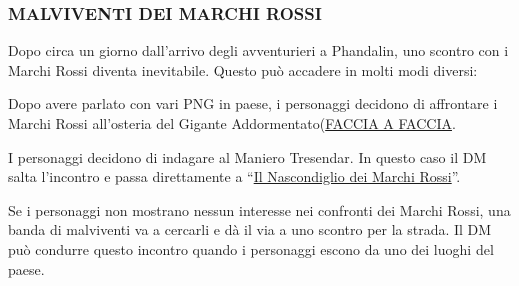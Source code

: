 \documentclass{article}
\begin{document}
\subsubsection{MALVIVENTI DEI MARCHI ROSSI}
\hypertarget{incontro}{}
Dopo circa un giorno dall'arrivo degli avventurieri a
Phandalin, uno scontro con i Marchi Rossi diventa
inevitabile. Questo può accadere in molti modi diversi:
\begin{enumerate}{
    \item Dopo avere parlato con vari PNG in paese, i personaggi
decidono di affrontare i Marchi Rossi all’osteria del Gigante
Addormentato(\hyperlink{faccia}{FACCIA A FACCIA}.
    \item I personaggi decidono di indagare al Maniero Tresendar. In
questo caso il DM salta l’incontro e passa direttamente a “\hyperlink{nascondiglio}{Il
Nascondiglio dei Marchi Rossi}”.
    \item Se i personaggi non mostrano nessun interesse nei confronti
dei Marchi Rossi, una banda di malviventi va a
cercarli e dà il via a uno scontro per la strada. Il DM può
condurre questo incontro quando i personaggi escono da
uno dei luoghi del paese.
}
\end{enumerate}
\end{document}
